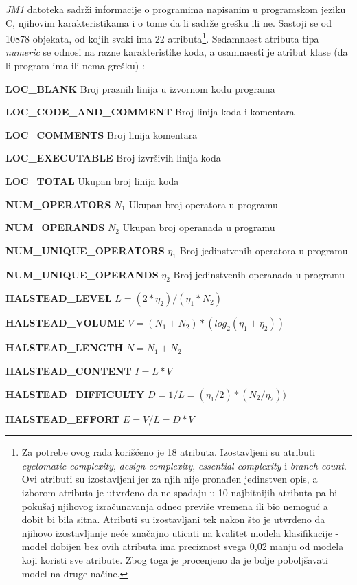 \documentclass[12pt,oneside]{memoir}
\begin{document}
\textit{JM1} datoteka sadrži informacije o programima napisanim u programskom jeziku C, njihovim karakteristikama i o tome da li sadrže grešku ili ne. Sastoji se od 10878 objekata, od kojih svaki ima 22 atributa\footnote{Za potrebe ovog rada korišćeno je 18 atributa.  Izostavljeni su atributi \textit{cyclomatic complexity}, \textit{design complexity}, \textit{essential complexity} i \textit{branch count}. Ovi atributi su izostavljeni jer za njih nije pronađen jedinstven opis, a izborom atributa je utvrđeno da ne spadaju u 10 najbitnijih atributa pa bi pokušaj njihovog izračunavanja odneo previše vremena ili bio nemoguć a dobit bi bila sitna. Atributi su izostavljani tek nakon što je utvrđeno da njihovo izostavljanje neće značajno uticati na kvalitet modela klasifikacije - model dobijen bez ovih atributa ima preciznost svega 0,02 manju od modela koji koristi sve atribute. Zbog toga je procenjeno da je bolje poboljšavati model na druge načine. }. Sedamnaest atributa tipa \textit{numeric} se odnosi na razne karakteristike koda, a osamnaesti je atribut klase (da li program ima ili nema grešku) \cite{jm1}: 

\textbf{LOC\_BLANK} Broj praznih linija u izvornom kodu programa

\textbf{LOC\_CODE\_AND\_COMMENT} Broj linija koda i komentara

\textbf{LOC\_COMMENTS} Broj linija komentara

\textbf{LOC\_EXECUTABLE} Broj izvršivih linija koda

\textbf{LOC\_TOTAL} Ukupan broj linija koda

\textbf{NUM\_OPERATORS} $N_1$ Ukupan broj operatora u programu

\textbf{NUM\_OPERANDS} $N_2$ Ukupan broj operanada u programu

\textbf{NUM\_UNIQUE\_OPERATORS} $\eta_1$ Broj jedinstvenih operatora u programu

\textbf{NUM\_UNIQUE\_OPERANDS} $\eta_2$ Broj jedinstvenih operanada u programu

\textbf{HALSTEAD\_LEVEL} $L = (2*\eta_2)/(\eta_1*N_2)$

\textbf{HALSTEAD\_VOLUME} $V = (N_1+N_2)*(log_2(\eta_1+\eta_2))$ %

\textbf{HALSTEAD\_LENGTH} $N = N_1+N_2$

\textbf{HALSTEAD\_CONTENT} $I = L*V$

\textbf{HALSTEAD\_DIFFICULTY} $D = 1/L = (\eta_1/2)*(N_2/\eta_2))$

\textbf{HALSTEAD\_EFFORT} $E = V/L = D*V$
\end{document}
